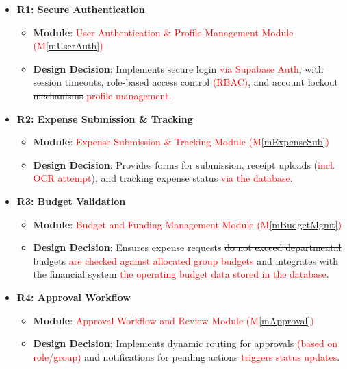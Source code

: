 \documentclass[12pt, titlepage]{article}
\newcommand{\mref}[1]{M\ref{#1}}
\begin{document}
\begin{itemize}
    \item \textbf{R1: Secure Authentication}
    \begin{itemize}
        \item \textbf{Module}: \textcolor{red}{User Authentication \& Profile Management Module (\mref{mUserAuth})}
        \item \textbf{Design Decision}: Implements secure login \textcolor{red}{via Supabase Auth}, \sout{with} session timeouts, role-based access control \textcolor{red}{(RBAC)}, and \sout{account lockout mechanisms} \textcolor{red}{profile management}.
    \end{itemize}

    \item \textbf{R2: Expense Submission \& Tracking}
    \begin{itemize}
        \item \textbf{Module}: \textcolor{red}{Expense Submission \& Tracking Module (\mref{mExpenseSub})}
        \item \textbf{Design Decision}: Provides forms for submission, receipt uploads (\textcolor{red}{incl. OCR attempt}), and tracking expense status \textcolor{red}{via the database}.
    \end{itemize}

    \item \textbf{R3: Budget Validation}
    \begin{itemize}
        \item \textbf{Module}: \textcolor{red}{Budget and Funding Management Module (\mref{mBudgetMgmt})}
        \item \textbf{Design Decision}: Ensures expense requests \sout{do not exceed departmental budgets} \textcolor{red}{are checked against allocated group budgets} and integrates with \sout{the financial system} \textcolor{red}{the operating budget data stored in the database}.
    \end{itemize}

    \item \textbf{R4: Approval Workflow}
    \begin{itemize}
        \item \textbf{Module}: \textcolor{red}{Approval Workflow and Review Module (\mref{mApproval})}
        \item \textbf{Design Decision}: Implements dynamic routing for approvals \textcolor{red}{(based on role/group)} and \sout{notifications for pending actions} \textcolor{red}{triggers status updates}.
    \end{itemize}


\end{itemize}
\end{document}
